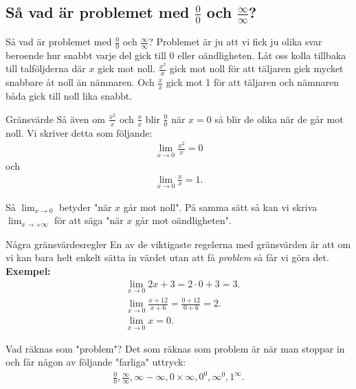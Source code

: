 \documentclass{beamer}
\begin{document}
\subsection*{Så vad är problemet med \(\frac{0}{0}\) och \(\frac{\infty}{\infty}\)?}
\label{sec:orge1ed2aa}
\begin{frame}{Så vad är problemet med \( \frac{0}{0} \) och \( \frac{\infty}{\infty} \)?}
Problemet är ju att vi fick ju olika svar beroende hur snabbt
varje del gick till \(0\) eller oändligheten.
Låt oss kolla tillbaka till talföljderna där \(x\) gick mot noll.
\(\frac{x^2}{x}\) gick mot noll för att täljaren gick mycket
snabbare åt noll än nämnaren. Och 
\(\frac{x}{x}\) gick mot 1 för att täljaren och nämnaren båda
gick till noll lika snabbt.
\end{frame}

\begin{frame}{Gränsvärde}
Så även om \(\frac{x^2}{x}\) och \(\frac{x}{x}\) blir \(\frac{0}{0}\) när \(x=0\) så blir de olika när
de går mot noll. Vi skriver detta som följande:
\begin{align*}
\lim_{ x \to 0 } \frac{x^2}{x} = 0
\end{align*}
och
\begin{align*}
\lim_{ x \to 0 } \frac{x}{x} = 1
.
\end{align*}

Så \(\lim_{ x \to 0 }\) betyder "när \(x\) går mot noll". På samma sätt så kan
vi skriva \(\lim_{ x \to +\infty }\) för att säga "när \(x\) går mot oändligheten".
\end{frame}

\begin{frame}{Några gränsvärdesregler}
En av de viktigaste regelerna med gränsvärden är att om vi kan
bara helt enkelt sätta in värdet utan att få \emph{problem} så
får vi göra det.
\newline
\textbf{Exempel:}
\begin{align*}
 &  \lim_{ x \to 0 } 2x + 3 = 2\cdot 0 + 3 = 3. \\
 &  \lim_{ x \to 0 } \frac{x+12}{x+6} = \frac{0+12}{0+6} = 2. \\
 &  \lim_{ x \to 0 } x = 0.
\end{align*}
\end{frame}

\begin{frame}{Vad räknas som "problem"?}
Det som räknas som problem är när man stoppar in och får någon
av följande "farliga" uttryck:
\begin{align*}
\frac{0}{0}, \frac{\infty}{\infty}, \infty -\infty , 0 \times \infty , 0 ^{0}, \infty ^{0}, 1 ^{\infty}
.
\end{align*}
\end{frame}
\end{document}

